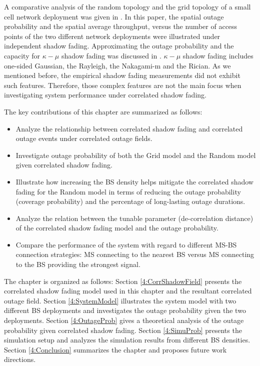  
 
 \par A comparative analysis of the random topology and the grid topology of a small cell network deployment was given in \cite{chen2012small}. In this paper, the spatial outage probability and the spatial average throughput, versus the number of access points of the two different network deployments were illustrated under independent shadow fading. Approximating the outage probability and the capacity for $\kappa-\mu$ shadow fading was discussed in \cite{kumar2015approximate}. $\kappa-\mu$ shadow fading includes one-sided Gaussian, the Rayleigh, the Nakagami-m and the Rician. As we mentioned before, the empirical shadow fading measurements did not exhibit such features. Therefore, those complex features are not the main focus when investigating system performance under correlated shadow fading.
 \par The key contributions of this chapter are summarized as follows:
 \begin{itemize}
 \item Analyze the relationship between correlated shadow fading and correlated outage events under correlated outage fields.
 \item Investigate outage probability of both the Grid model and the Random model given correlated shadow fading.
 \item Illustrate how increasing the BS density helps mitigate the correlated shadow fading for the Random model in terms of reducing the outage probability (coverage probability) and the percentage of long-lasting outage durations.
 \item Analyze the relation between the tunable parameter (de-correlation distance) of the correlated shadow fading model and the outage probability.
 \item Compare the performance of the system with regard to different MS-BS connection strategies: MS connecting to the nearest BS versus MS connecting to the BS providing the strongest signal.
 \end{itemize}
 The chapter is organized as follows: Section \ref{4:CorrShadowField} presents the correlated shadow fading model used in this chapter and the resultant correlated outage field. Section \ref{4:SystemModel} illustrates the system model with two different BS deployments and investigates the outage probability given the two deployments. Section \ref{4:OutageProb} gives a theoretical analysis of the outage probability given correlated shadow fading. Section \ref{4:SimuProb} presents the simulation setup and analyzes the simulation results from different BS densities. Section \ref{4:Conclusion} summarizes the chapter and proposes future work directions.
 
